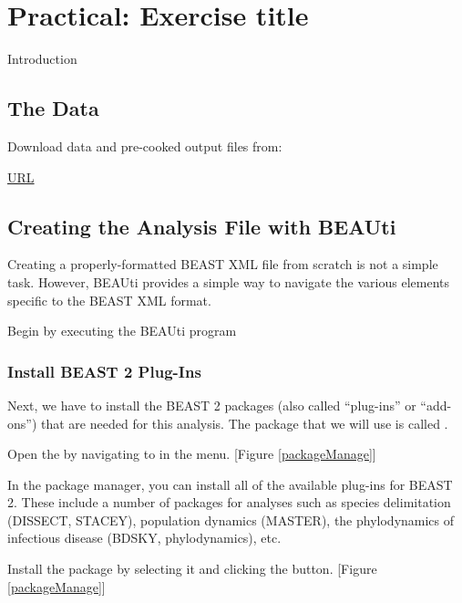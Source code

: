 \documentclass[11pt]{article}
\begin{document}
\newpage
\section{Practical: Exercise title}

Introduction

\bigskip
\subsection{The Data}

\begin{framed}
Download data and pre-cooked output files from:
\begin{center}
\href{google.com}{URL} 
\end{center}
\end{framed}



\bigskip
\subsection{Creating the Analysis File with BEAUti}

Creating a properly-formatted BEAST XML file from scratch is not a simple task. However, BEAUti provides a simple way to navigate the various elements specific to the BEAST XML format. 

\begin{framed}
Begin by executing the BEAUti program
\end{framed}


\bigskip
\subsubsection{Install BEAST 2 Plug-Ins}

Next, we have to install the BEAST 2 packages (also called ``plug-ins'' or ``add-ons'') that are needed for this analysis. 
The package that we will use is called .
\begin{framed}
Open the  by navigating to  in the menu. [Figure \ref{packageManage}]
\end{framed}

In the package manager, you can install all of the available plug-ins for BEAST 2. 
These include a number of packages for analyses such as species delimitation (DISSECT, STACEY), population dynamics (MASTER), the phylodynamics of infectious disease (BDSKY, phylodynamics), etc. 
\begin{framed}
Install the  package by selecting it and clicking the  button. [Figure \ref{packageManage}]
\end{framed}
\end{document}
